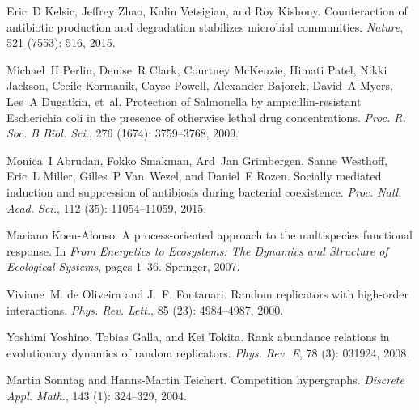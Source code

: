Eric~D Kelsic, Jeffrey Zhao, Kalin Vetsigian, and Roy Kishony.
\newblock Counteraction of antibiotic production and degradation stabilizes
microbial communities.
\newblock \emph{Nature}, 521 (7553): 516, 2015.

Michael~H Perlin, Denise~R Clark, Courtney McKenzie, Himati Patel, Nikki
Jackson, Cecile Kormanik, Cayse Powell, Alexander Bajorek, David~A Myers,
Lee~A Dugatkin, et~al.
\newblock Protection of {{Salmonella}} by ampicillin-resistant {{Escherichia}}
coli in the presence of otherwise lethal drug concentrations.
\newblock \emph{Proc. R. Soc. B Biol. Sci.}, 276 (1674):
3759--3768, 2009.

Monica~I Abrudan, Fokko Smakman, Ard~Jan Grimbergen, Sanne Westhoff, Eric~L
Miller, Gilles~P Van~Wezel, and Daniel~E Rozen.
\newblock Socially mediated induction and suppression of antibiosis during
bacterial coexistence.
\newblock \emph{Proc. Natl. Acad. Sci.}, 112 (35):
11054--11059, 2015.

Mariano {Koen-Alonso}.
\newblock A process-oriented approach to the multispecies functional response.
\newblock In \emph{From Energetics to Ecosystems: The Dynamics and Structure of
    Ecological Systems}, pages 1--36. {Springer}, 2007.

Viviane~M. {de Oliveira} and J.~F. Fontanari.
\newblock Random replicators with high-order interactions.
\newblock \emph{Phys. Rev. Lett.}, 85 (23): 4984--4987, 2000.

Yoshimi Yoshino, Tobias Galla, and Kei Tokita.
\newblock Rank abundance relations in evolutionary dynamics of random
replicators.
\newblock \emph{Phys. Rev. E}, 78 (3): 031924, 2008.

Martin Sonntag and Hanns-Martin Teichert.
\newblock Competition hypergraphs.
\newblock \emph{Discrete Appl. Math.}, 143 (1): 324--329,
2004.

